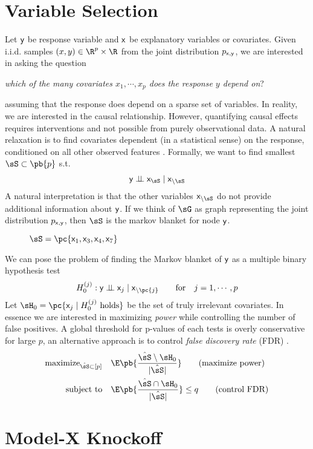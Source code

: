 \documentclass[11pt]{article}
\begin{document}
\section{Variable Selection}
 
Let $\mathsf{y}$ be response variable and $\mathsf{x}$ be explanatory variables or covariates. Given i.i.d. samples $(x,y)\in\R^p\times\R$ from the joint distribution $p_{\mathsf{x},\mathsf{y}}$, we are interested in asking the question 
\begin{center}
    \textit{which of the many covariates $x_1,\cdots,x_p$ does the response $y$ depend on}?
\end{center}
assuming that the response does depend on a sparse set of variables. In reality, we are interested in the causal relationship. However, quantifying causal effects requires interventions and not possible from purely observational data. A natural relaxation is to find covariates dependent (in a statistical sense) on the response, conditioned on all other observed features \cite{gimenezKnockoffsMassNew2019}. Formally, we want to find smallest $\sS\subset\pb{p}$ s.t.
\begin{align*}
    \ry \dperp \rx_{\sS} \mid \rx_{\setminus\sS}
\end{align*} 
A natural interpretation is that the other variables $\rx_{\setminus\sS}$ do not provide additional information about $\mathsf{y}$. If we think of $\sG$ as graph representing the joint distribution $p_{\mathsf{x},\mathsf{y}}$, then $\sS$ is the markov blanket for node $\mathsf{y}$. 
\begin{figure}[h!]
    \caption{$\sS =\pc{\rx_1,\rx_3,\rx_4,\rx_7}$}
\end{figure}
We can pose the problem of finding the Markov blanket of $\mathsf{y}$ as a multiple binary hypothesis test
\begin{align*}
    H_0^{(j)}:
        \ry \dperp \rx_j \mid \rx_{\setminus \pc{j}} 
    \quad\quad\text{for}\quad
        j = 1,\cdots,p
\end{align*}
Let $\sH_0 = \pc{\rx_j \mid H_0^{(j)} \text{ holds}}$ be the set of truly irrelevant covariates. In essence we are interested in maximizing \textit{power} while controlling the number of false positives. A global threshold for p-values of each tests is overly conservative for large $p$, an alternative approach is to control \textit{false discovery rate} (FDR) \cite{benjaminiControllingFalseDiscovery1995}.
\begin{align*}
    \text{maximize}_{\hat{\sS}\subset [p]}\quad
        &\E\pb{\frac{ \hat{\sS} \setminus \sH_0 }{ |\hat{\sS}| }} 
            \tag{maximize power} \\
    \text{subject to}\quad
        &\E\pb{ \frac{\hat{\sS} \cap \sH_0}{|\hat{\sS}|} } \leq q
            \tag{control FDR}
\end{align*}

\section{Model-X Knockoff}

 



\newpage
\printbibliography 
\end{document}
